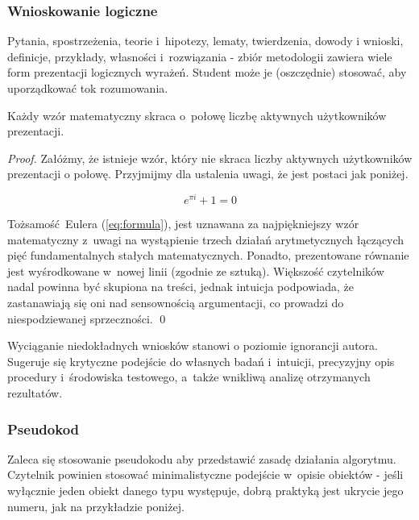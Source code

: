 \subsubsection{Wnioskowanie logiczne}
\label{subsubsec:logic}

Pytania, spostrzeżenia, teorie i~hipotezy, lematy, twierdzenia, dowody i wnioski, definicje, przykłady, własności i~rozwiązania - zbiór metodologii zawiera wiele form prezentacji logicznych wyrażeń. Student może je (oszczędnie) stosować, aby uporządkować tok rozumowania.

\begin{claim}
	Każdy wzór matematyczny skraca o~połowę liczbę aktywnych użytkowników prezentacji.
\end{claim}
\begin{proof}
	Załóżmy, że istnieje wzór, który nie skraca liczby aktywnych użytkowników prezentacji o połowę. Przyjmijmy dla ustalenia uwagi, że jest postaci jak poniżej.

	\begin{equation} \label{eq:formula}
	e^{\pi i} + 1 = 0
	\end{equation}

	\noindent Tożsamość Eulera (\ref{eq:formula}), jest uznawana za najpiękniejszy wzór matematyczny z~uwagi na wystąpienie trzech działań arytmetycznych łączących pięć fundamentalnych stałych matematycznych. Ponadto, prezentowane równanie jest wyśrodkowane w~nowej linii (zgodnie ze sztuką). Większość czytelników nadal powinna być skupiona na treści, jednak intuicja podpowiada, że zastanawiają się oni nad sensownością argumentacji, co prowadzi do niespodziewanej sprzeczności. \qed
\end{proof}

Wyciąganie niedokładnych wniosków stanowi o poziomie ignorancji autora. Sugeruje się krytyczne podejście do własnych badań i~intuicji, precyzyjny opis procedury i~środowiska testowego, a~także wnikliwą analizę otrzymanych rezultatów.

\subsubsection{Pseudokod}
\label{subsubsec:pseudocode}

Zaleca się stosowanie pseudokodu aby przedstawić zasadę działania algorytmu. Czytelnik powinien stosować minimalistyczne podejście w~opisie obiektów - jeśli wyłącznie jeden obiekt danego typu występuje, dobrą praktyką jest ukrycie jego numeru, jak na przykładzie poniżej.

